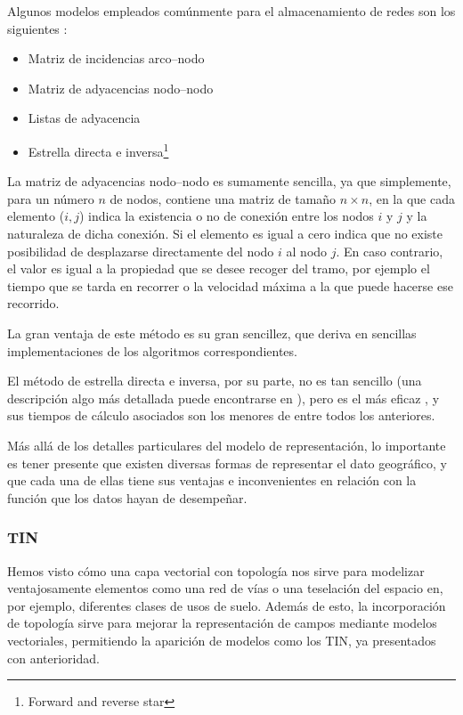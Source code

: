 \begin{multicols}{2}
Algunos modelos empleados comúnmente para el almacenamiento de redes son los siguientes \cite{NCGIA}:

\begin{itemize}
\item Matriz de incidencias arco--nodo
\item Matriz de adyacencias nodo--nodo
\item Listas de adyacencia
\item Estrella directa e inversa\footnote{Forward and reverse star}
\end{itemize}


La matriz de adyacencias nodo--nodo es sumamente sencilla, ya que simplemente, para un número $n$ de nodos, contiene una matriz de tamaño $n\times n$, en la que cada elemento ($i,j$) indica la existencia o no de conexión entre los nodos $i$ y $j$ y la naturaleza de dicha conexión. Si el elemento es igual a cero indica que no existe posibilidad de desplazarse directamente del nodo $i$ al nodo $j$. En caso contrario, el valor es igual a la propiedad que se desee recoger del tramo, por ejemplo el tiempo que se tarda en recorrer o la velocidad máxima a la que puede hacerse ese recorrido.

La gran ventaja de este método es su gran sencillez, que deriva en sencillas implementaciones de los algoritmos correspondientes.

El método de estrella directa e inversa, por su parte, no es tan sencillo (una descripción algo más detallada puede encontrarse en \cite{NCGIA}), pero es el más eficaz \cite{Ahuja1993Prentice}, y sus tiempos de cálculo asociados son los menores de entre todos los anteriores. 

Más allá de los detalles particulares del modelo de representación, lo importante es tener presente que existen diversas formas de representar el dato geográfico, y que cada una de ellas tiene sus ventajas e inconvenientes en relación con la función que los datos hayan de desempeñar.

\subsubsection{TIN}
\label{TIN}

Hemos visto cómo una capa vectorial con topología nos sirve para modelizar ventajosamente elementos como una red de vías o una teselación del espacio en, por ejemplo, diferentes clases de usos de suelo. Además de esto, la incorporación de topología sirve para mejorar la representación de campos mediante modelos vectoriales, permitiendo la aparición de modelos como los TIN, ya presentados con anterioridad. 


\end{multicols}

